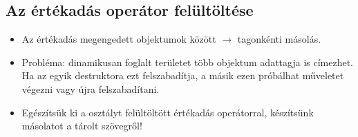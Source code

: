 \documentclass[usenames,dvipsnames,aspectratio=169]{beamer}
\begin{document}
\subsection{Az értékadás operátor felültöltése}

\begin{frame}
    \begin{itemize}
        \item Az értékadás megengedett objektumok között $\to$ tagonkénti másolás.
        \item Probléma: dinamikusan foglalt területet több objektum adattagja is címezhet. Ha az egyik destruktora ezt felszabadítja, a másik ezen próbálhat műveletet végezni vagy újra felszabadítani.
        \item Egészítsük ki a  osztályt felültöltött értékadás operátorral, készítsünk másolatot a tárolt szövegről!
    \end{itemize}
\end{frame}
\end{document}
